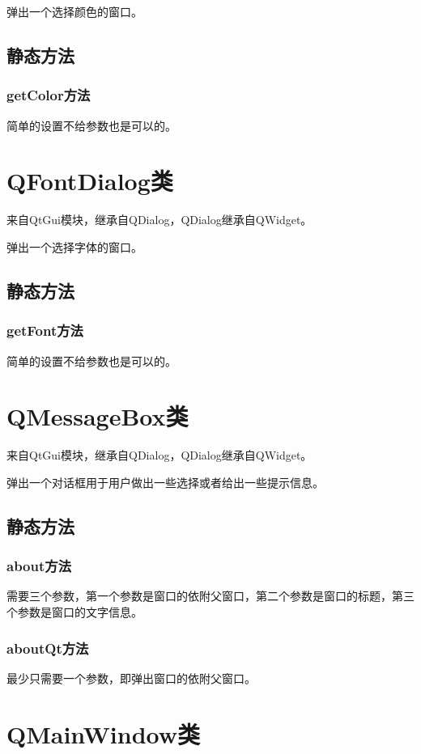 \documentclass[12pt,oneside]{book}
\begin{document}
\begin{common-format}
弹出一个选择颜色的窗口。

\subsection{静态方法}
\subsubsection{getColor方法}
简单的设置不给参数也是可以的。

\section{QFontDialog类}
来自QtGui模块，继承自QDialog，QDialog继承自QWidget。

弹出一个选择字体的窗口。
\subsection{静态方法}
\subsubsection{getFont方法}
简单的设置不给参数也是可以的。


\section{QMessageBox类}
来自QtGui模块，继承自QDialog，QDialog继承自QWidget。

弹出一个对话框用于用户做出一些选择或者给出一些提示信息。

\subsection{静态方法}
\subsubsection{about方法}
需要三个参数，第一个参数是窗口的依附父窗口，第二个参数是窗口的标题，第三个参数是窗口的文字信息。

\subsubsection{aboutQt方法}
最少只需要一个参数，即弹出窗口的依附父窗口。


\section{QMainWindow类}




\end{common-format}
\end{document}
